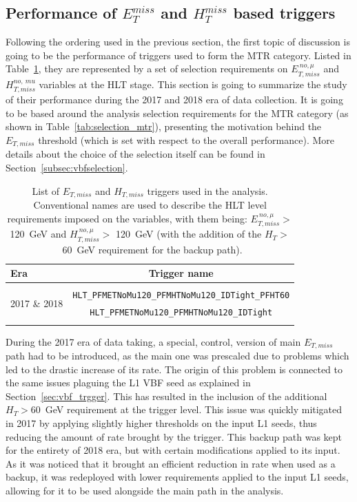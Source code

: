 \subsection{Performance of $E_T^{miss}$ and $H_T^{miss}$ based triggers}
\label{subsec:mtr_triggers}
\hspace{10pt} Following the ordering used in the previous section, the first topic of discussion is going to be the performance of triggers used to form the MTR category. Listed in Table~\ref{tab:metmht}, they are represented by a set of selection requirements on $E_{T,miss}^{~no,\mu}$ and $H_{T,miss}^{no,~mu}$ variables at the HLT stage. This section is going to summarize the study of their performance during the 2017 and 2018 era of data collection. It is going to be based around the analysis selection requirements for the MTR category (as shown in Table~\ref{tab:selection_mtr}), presenting the motivation behind the $E_{T,miss}$ threshold (which is set with respect to the overall performance). More details about the choice of the selection itself can be found in Section~\ref{subsec:vbfselection}.

\begin{table}[htbp]
\centering
\begin{tabular}{l|c}
\hline\hline
Era & Trigger name                                               \\ \hline
\multirow{4}{*}{2017 \& 2018} &\\
                      &\texttt{HLT\_PFMETNoMu120\_PFMHTNoMu120\_IDTight\_PFHT60}\\
                        &\texttt{HLT\_PFMETNoMu120\_PFMHTNoMu120\_IDTight}\\ 
                        &\\\hline
\hline\hline
\end{tabular}
\caption{List of $E_{T,miss}$ and $H_{T,miss}$  triggers used in the analysis. Conventional names are used to describe the HLT level requirements imposed on the variables, with them being: $E_{T,miss}^{~no,\mu}>$ 120~GeV and $H_{T,miss}^{~no,\mu}>$ 120~GeV (with the addition of the $H_T>$~60~GeV requirement for the backup path).  \label{tab:metmht}}
\end{table}
\hspace{10pt} During the 2017 era of data taking, a special, control, version of main $E_{T,miss}$ path had to be introduced, as the main one was prescaled due to problems which led to the drastic increase of its rate. The origin of this problem is connected to the same issues plaguing the L1 VBF seed as explained in Section~\ref{sec:vbf_trgger}. This has resulted in the inclusion of the additional $H_T>$60~GeV requirement at the trigger level. This issue was quickly mitigated in 2017 by applying slightly higher thresholds on the input L1 seeds, thus reducing the amount of rate brought by the trigger. This backup path was kept for the entirety of 2018 era, but with certain modifications applied to its input. As it was noticed that it brought an efficient reduction in rate when used as a backup, it was redeployed with lower requirements applied to the input L1 seeds, allowing for it to be used alongside the main path in the analysis.

